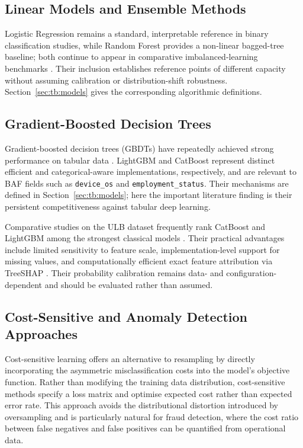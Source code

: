\subsection{Linear Models and Ensemble Methods}
\label{subsec:sota-linear-ensemble}

Logistic Regression remains a standard, interpretable reference in binary classification studies, while Random Forest provides a non-linear bagged-tree baseline; both continue to appear in comparative imbalanced-learning benchmarks \cite{leevy2023binary}. Their inclusion establishes reference points of different capacity without assuming calibration or distribution-shift robustness. Section~\ref{sec:tb:models} gives the corresponding algorithmic definitions.

\subsection{Gradient-Boosted Decision Trees}
\label{subsec:sota-gbdt}

Gradient-boosted decision trees (GBDTs) have repeatedly achieved strong performance on tabular data \cite{shwartzziv2022tabular}. LightGBM \cite{ke2017lightgbm} and CatBoost \cite{prokhorenkova2018catboost} represent distinct efficient and categorical-aware implementations, respectively, and are relevant to BAF fields such as \texttt{device\_os} and \texttt{employment\_status}. Their mechanisms are defined in Section~\ref{sec:tb:models}; here the important literature finding is their persistent competitiveness against tabular deep learning.

Comparative studies on the ULB dataset frequently rank CatBoost and LightGBM among the strongest classical models \cite{leevy2023binary, singh2025benchmarking}. Their practical advantages include limited sensitivity to feature scale, implementation-level support for missing values, and computationally efficient exact feature attribution via TreeSHAP \cite{lundberg2020local}. Their probability calibration remains data- and configuration-dependent and should be evaluated rather than assumed.

\subsection{Cost-Sensitive and Anomaly Detection Approaches}
\label{subsec:sota-anomaly}

Cost-sensitive learning \cite{hoppner2021idcs} offers an alternative to resampling by directly incorporating the asymmetric misclassification costs into the model's objective function. Rather than modifying the training data distribution, cost-sensitive methods specify a loss matrix and optimise expected cost rather than expected error rate. This approach avoids the distributional distortion introduced by oversampling and is particularly natural for fraud detection, where the cost ratio between false negatives and false positives can be quantified from operational data.

